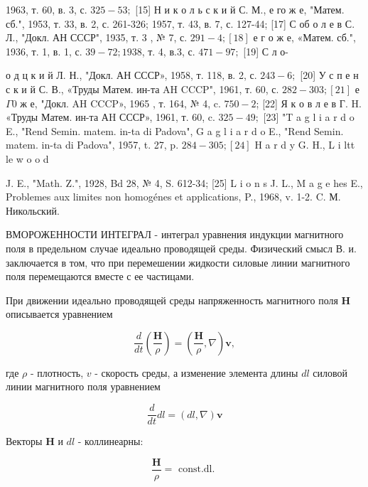 \documentclass[10pt]{article}
\begin{document}
1963, т. 60, в. 3, с. $325-53 ;$ [15] Н и к о л ь с к и й С. М., е го ж е, "Матем. сб.", 1953, т. 33, в. 2, с. 261-326; 1957, т. 43, в. 7, с. 127-44; [17] С об о л е в С. Л., "Докл. АН СССР", 1935, т. 3 , № 7, с. $291-4 ;[18]$ е г о ж е, «Матем. сб.", 1936, т. 1, в. 1, с. $39-72 ; 1938$, т. 4, в.3, с. $471-97 ;$ [19] С л о-

о д ц к и й Л. Н., "Докл. АН СССР», 1958, т. 118, в. 2, с. $243-6 ;$ [20] У с п е н с к и й С. В., «Труды Матем. ин-та AH CCCP", 1961, т. 60, с. $282-303 ;[21]$ е $\Gamma 0$ ж е, "Докл. AH CCCP», 1965 , т. 164, № 4, c. $750-2$; [22] Я к о в л е в Г. H. «Труды Матем. ин-та АH СССР», 1961, т. 60, c. $325-49 ;$ [23] "T a g l i a r d o E., "Rend Semin. matem. in-ta di Padova", G a g l i a r d o E., "Rend Semin. matem. in-ta di Padova", 1957, t. 27, p. $284-305 ;[24]$ H a r d y G. H., L i ltt le w o o d

J. E., "Math. Z.", 1928, Bd 28, № 4, S. 612-34; [25] L i o n s J. L., M a g e hes E., Problemes aux limites non homogénes et applications, P., 1968, v. 1-2. C. М. Никольский.



ВМОРОЖЕННОСТИ ИНТЕГРАЛ - интеграл уравнения индукции магнитного поля в предельном случае идеально проводящей среды. Физический смысл В. и. заключается в том, что при перемешении жидкости силовые линии магнитного поля перемещаются вместе с ее частицами.



При движении идеально проводящей среды напряженность магнитного поля $\boldsymbol{H}$ описывается уравнением



\[

\frac{d}{d t}\left(\frac{\boldsymbol{H}}{\rho}\right)=\left(\frac{\boldsymbol{H}}{\rho}, \nabla\right) \boldsymbol{v},

\]



где $\rho$ - плотность, $v$ - скорость среды, а изменение элемента длины $d l$ силовой линии магнитного поля уравнением



\[

\frac{d}{d t} d l=(d l, \nabla) \boldsymbol{v}

\]



Векторы $\boldsymbol{H}$ и $d l$ - коллинеарны:



\[

\frac{\boldsymbol{H}}{\rho}=\text { const.dl. }

\]
\end{document}

